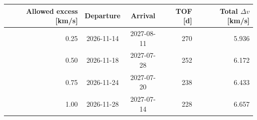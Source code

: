 \begin{tabular}{rccrr}
\toprule
Allowed excess [km/s] & Departure & Arrival & TOF [d] & Total $\Delta v$ [km/s] \\
\midrule
0.25 & 2026-11-14 & 2027-08-11 & 270 & 5.936 \\
0.50 & 2026-11-18 & 2027-07-28 & 252 & 6.172 \\
0.75 & 2026-11-24 & 2027-07-20 & 238 & 6.433 \\
1.00 & 2026-11-28 & 2027-07-14 & 228 & 6.657 \\
\bottomrule
\end{tabular}
